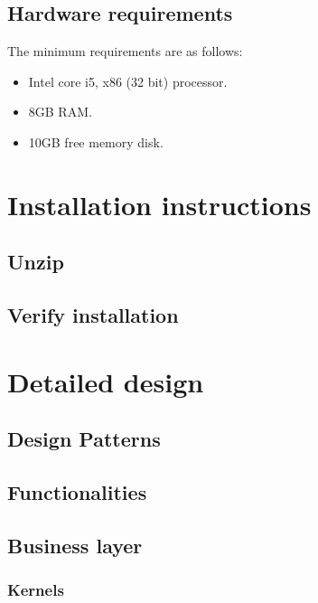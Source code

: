 \documentclass[signature]{deltares_manual}
\begin{document}
\section{Hardware requirements}
\label{sec:hwRequirements}
The minimum requirements are as follows:
\begin{itemize}
\item Intel core i5, x86 (32 bit) processor.
\item 8GB RAM.
\item 10GB free memory disk.
\end{itemize}

\chapter{Installation instructions}
\label{installation}
\section{Unzip}
\label{sec:Unzip}

\section{Verify installation}
\label{sec:VerificateInstallation}

\chapter{Detailed design}
\label{detailedDesign}

\section{Design Patterns}
\label{sec:designPatterns}


\section{Functionalities}
\label{sec:functionalities}

\section{Business layer}
\label{sec:businessLayer}

\subsection{Kernels}
\label{subsec:kernels}
\end{document}
